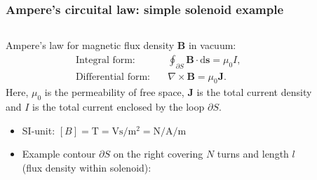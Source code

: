 \begin{frame}
	\frametitle{Ampere's circuital law: simple solenoid example}
	\begin{columns}
		\begin{column}{0.575\textwidth}
			Ampere's law for magnetic flux density $\bm{B}$ in vacuum:
            \begin{align}
                \mbox{Integral form:} \quad &\oint_{\partial S} \bm{B} \cdot \mathrm{d}\bm{s} = \mu_0 I,\\
                \mbox{Differential form:} \quad &\nabla \times \bm{B} = \mu_0\bm{J}. 
            \end{align}
            Here, $\mu_0$ is the permeability of free space, $\bm{J}$ is the total current density and $I$ is the total current enclosed by the loop $\partial S$. 
            \vspace{0.25cm}
            \begin{itemize}
                \item<2-> SI-unit: $[B] = \si{\tesla} = \si{\volt\second\per\metre\squared} = \si{\newton\per\ampere\per\metre}$
                \item<3-> Example contour $\partial S$  on the right covering $N$ turns and length $l$ (flux density within solenoid):
            \end{itemize}
		\end{column}
        \hfill
		\begin{column}{0.425\textwidth}
            \vspace{-0.2cm}
			\begin{figure}
				\centering

\end{figure}
\end{column}
\end{columns}
\end{frame}
